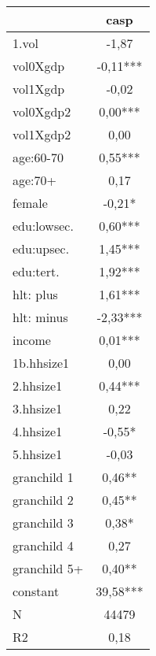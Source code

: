 {
\def\sym#1{\ifmmode^{#1}\else\(^{#1}\)\fi}
\begin{tabular}{l*{1}{c}}
\hline\hline
            &\multicolumn{1}{c}{casp}\\
\hline
1.vol       &       -1,87   \\
vol0Xgdp    &       -0,11***\\
vol1Xgdp    &       -0,02   \\
vol0Xgdp2   &        0,00***\\
vol1Xgdp2   &        0,00   \\
age:60-70   &        0,55***\\
age:70+     &        0,17   \\
female      &       -0,21*  \\
edu:lowsec. &        0,60***\\
edu:upsec.  &        1,45***\\
edu:tert.   &        1,92***\\
hlt: plus   &        1,61***\\
hlt: minus  &       -2,33***\\
income      &        0,01***\\
1b.hhsize1  &        0,00   \\
2.hhsize1   &        0,44***\\
3.hhsize1   &        0,22   \\
4.hhsize1   &       -0,55*  \\
5.hhsize1   &       -0,03   \\
granchild 1 &        0,46** \\
granchild 2 &        0,45** \\
granchild 3 &        0,38*  \\
granchild 4 &        0,27   \\
granchild 5+&        0,40** \\
constant    &       39,58***\\
\hline
N           &       44479   \\
R2          &        0,18   \\
\hline\hline
\end{tabular}
}
